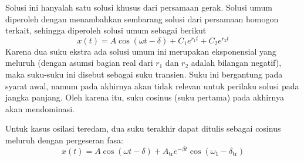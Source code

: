 Solusi ini hanyalah satu solusi khusus dari persamaan gerak. Solusi
umum diperoleh dengan menambahkan sembarang solusi dari persamaan
homogon terkait, sehingga diperoleh solusi umum sebagai berikut
\begin{equation}
x(t) = A\cos(\omega t-\delta) + C_{1}e^{r_{1}t} + C_{2}e^{r_{2}t}
\end{equation}
Karena dua suku ekstra ada solusi umum ini merupakan eksponensial
yang meluruh (dengan asumsi bagian real dari $r_{1}$ dan $r_{2}$
adalah bilangan negatif), maka suku-suku ini disebut sebagai suku
transien. Suku ini bergantung pada syarat awal, namum pada akhirnya
akan tidak relevan untuk perilaku solusi pada jangka panjang. Oleh
karena itu, suku cosinus (suku pertama) pada akhirnya akan mendominasi.

Untuk kasus osilasi teredam, dua suku terakhir dapat ditulis sebagai
cosinus meluruh dengan pergeseran fasa:
\begin{equation}
x(t)=A\cos(\omega t-\delta)+A_{\mathrm{tr}}e^{-\beta t}\cos(\omega_{1}-\delta_{\mathrm{tr}})
\end{equation}